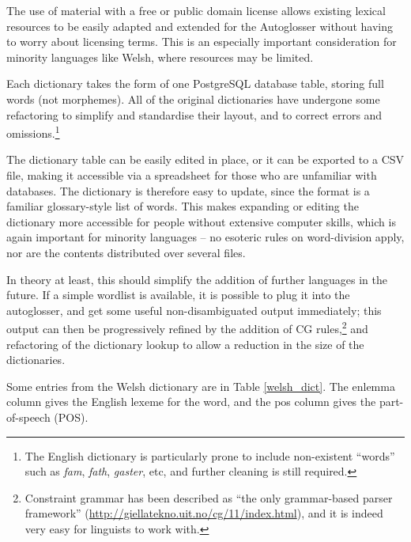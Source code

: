 \documentclass[11pt]{article}
\begin{document}
The use of material with a free or public domain license allows existing lexical resources to be easily adapted and extended for the Autoglosser without having to worry about licensing terms.  This is an especially important consideration for minority languages like Welsh,\cite{streiter2006} where resources may be limited.

Each dictionary takes the form of one PostgreSQL database table, storing full words (not morphemes).  All of the original dictionaries have undergone some refactoring to simplify and standardise their layout, and to correct errors and omissions.\footnote{The English dictionary is particularly prone to include non-existent ``words'' such as \textit{fam}, \textit{fath}, \textit{gaster}, etc, and further cleaning is still required.}

The dictionary table can be easily edited in place, or it can be exported to a CSV file, making it accessible via a spreadsheet for those who are unfamiliar with databases.  The dictionary is therefore easy to update, since the format is a familiar glossary-style list of words.  This makes expanding or editing the dictionary more accessible for people without extensive computer skills, which is again important for minority languages -- no esoteric rules on word-division apply, nor are the contents distributed over several files.

In theory at least, this should simplify the addition of further languages in the future.  If a simple wordlist is available, it is possible to plug it into the autoglosser, and get some useful non-disambiguated output immediately; this output can then be progressively refined by the addition of CG rules,\footnote{Constraint grammar has been described as ``the only grammar-based parser framework'' (\url{http://giellatekno.uit.no/cg/11/index.html}), and it is indeed very easy for linguists to work with.} and refactoring of the dictionary lookup to allow a reduction in the size of the dictionaries. 

Some entries from the Welsh dictionary are in Table \ref{welsh_dict}.  The enlemma column gives the English lexeme for the word, and the pos column gives the part-of-speech (POS).
\end{document}
